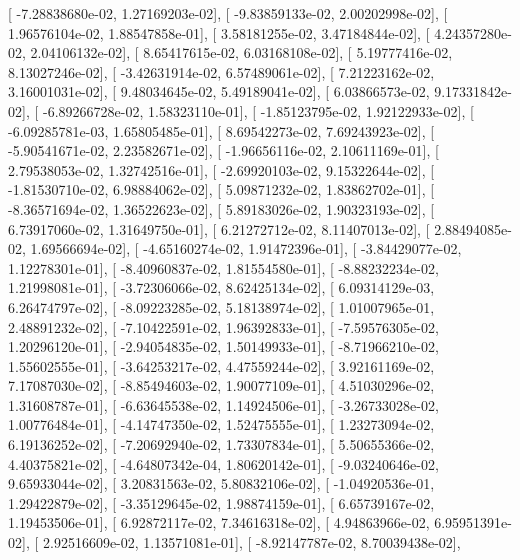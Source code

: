 \documentclass{article}
\begin{document}
       [ -7.28838680e-02,   1.27169203e-02],
       [ -9.83859133e-02,   2.00202998e-02],
       [  1.96576104e-02,   1.88547858e-01],
       [  3.58181255e-02,   3.47184844e-02],
       [  4.24357280e-02,   2.04106132e-02],
       [  8.65417615e-02,   6.03168108e-02],
       [  5.19777416e-02,   8.13027246e-02],
       [ -3.42631914e-02,   6.57489061e-02],
       [  7.21223162e-02,   3.16001031e-02],
       [  9.48034645e-02,   5.49189041e-02],
       [  6.03866573e-02,   9.17331842e-02],
       [ -6.89266728e-02,   1.58323110e-01],
       [ -1.85123795e-02,   1.92122933e-02],
       [ -6.09285781e-03,   1.65805485e-01],
       [  8.69542273e-02,   7.69243923e-02],
       [ -5.90541671e-02,   2.23582671e-02],
       [ -1.96656116e-02,   2.10611169e-01],
       [  2.79538053e-02,   1.32742516e-01],
       [ -2.69920103e-02,   9.15322644e-02],
       [ -1.81530710e-02,   6.98884062e-02],
       [  5.09871232e-02,   1.83862702e-01],
       [ -8.36571694e-02,   1.36522623e-02],
       [  5.89183026e-02,   1.90323193e-02],
       [  6.73917060e-02,   1.31649750e-01],
       [  6.21272712e-02,   8.11407013e-02],
       [  2.88494085e-02,   1.69566694e-02],
       [ -4.65160274e-02,   1.91472396e-01],
       [ -3.84429077e-02,   1.12278301e-01],
       [ -8.40960837e-02,   1.81554580e-01],
       [ -8.88232234e-02,   1.21998081e-01],
       [ -3.72306066e-02,   8.62425134e-02],
       [  6.09314129e-03,   6.26474797e-02],
       [ -8.09223285e-02,   5.18138974e-02],
       [  1.01007965e-01,   2.48891232e-02],
       [ -7.10422591e-02,   1.96392833e-01],
       [ -7.59576305e-02,   1.20296120e-01],
       [ -2.94054835e-02,   1.50149933e-01],
       [ -8.71966210e-02,   1.55602555e-01],
       [ -3.64253217e-02,   4.47559244e-02],
       [  3.92161169e-02,   7.17087030e-02],
       [ -8.85494603e-02,   1.90077109e-01],
       [  4.51030296e-02,   1.31608787e-01],
       [ -6.63645538e-02,   1.14924506e-01],
       [ -3.26733028e-02,   1.00776484e-01],
       [ -4.14747350e-02,   1.52475555e-01],
       [  1.23273094e-02,   6.19136252e-02],
       [ -7.20692940e-02,   1.73307834e-01],
       [  5.50655366e-02,   4.40375821e-02],
       [ -4.64807342e-04,   1.80620142e-01],
       [ -9.03240646e-02,   9.65933044e-02],
       [  3.20831563e-02,   5.80832106e-02],
       [ -1.04920536e-01,   1.29422879e-02],
       [ -3.35129645e-02,   1.98874159e-01],
       [  6.65739167e-02,   1.19453506e-01],
       [  6.92872117e-02,   7.34616318e-02],
       [  4.94863966e-02,   6.95951391e-02],
       [  2.92516609e-02,   1.13571081e-01],
       [ -8.92147787e-02,   8.70039438e-02],
\end{document}
